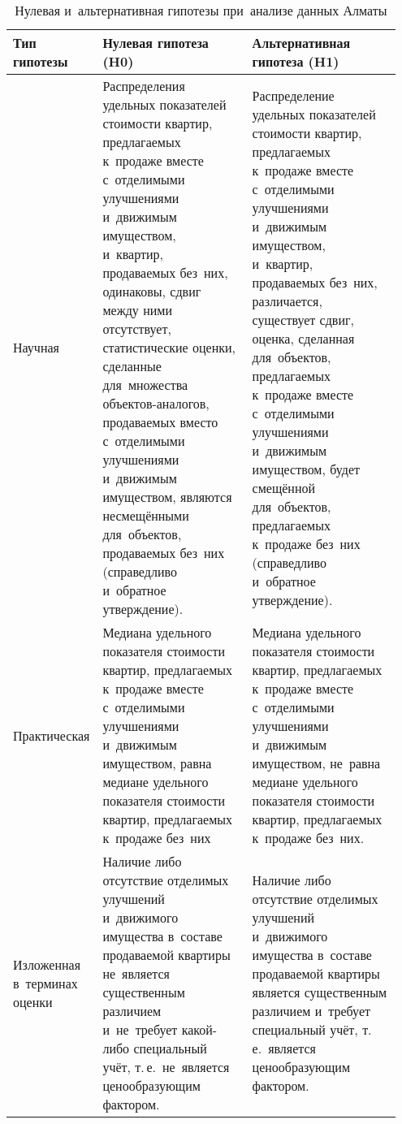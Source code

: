 \documentclass[]{scrartcl}
\begin{document}
\begin{table}[ht]
	\caption{Нулевая и~альтернативная гипотезы при~анализе данных Алматы}  \label{tab:nul-alt-hypothesis-almaty}
	\centering
	\begin{tabularx}{\textwidth}{p{0.15\linewidth} p{0.4\linewidth} p{0.4\linewidth}} 
		\hline
		Тип гипотезы&Нулевая гипотеза (H0)&Альтернативная гипотеза (H1)\\
		\hline
		Научная&Распределения удельных показателей стоимости квартир, предлагаемых к~продаже вместе с~отделимыми улучшениями и~движимым имуществом, и~квартир, продаваемых без~них, одинаковы, сдвиг между ними отсутствует, статистические оценки, сделанные для~множества объектов-аналогов, продаваемых вместо с~отделимыми улучшениями и~движимым имуществом, являются несмещёнными для~объектов, продаваемых без~них (справедливо и~обратное утверждение).&Распределение удельных показателей стоимости квартир, предлагаемых к~продаже вместе с~отделимыми улучшениями и~движимым имуществом, и~квартир, продаваемых без~них, различается, существует сдвиг, оценка, сделанная для~объектов, предлагаемых к~продаже вместе с~отделимыми улучшениями и~движимым имуществом, будет смещённой для~объектов, предлагаемых к~продаже без~них (справедливо и~обратное утверждение).\\
		\hline
		Практическая&Медиана удельного показателя стоимости квартир, предлагаемых к~продаже вместе с~отделимыми улучшениями и~движимым имуществом, равна медиане удельного показателя стоимости квартир, предлагаемых к~продаже без~них&Медиана удельного показателя стоимости квартир, предлагаемых к~продаже вместе с~отделимыми улучшениями и~движимым имуществом, не~равна медиане удельного показателя стоимости квартир, предлагаемых к~продаже без~них.\\
		\hline
		Изложенная в~терминах оценки&Наличие либо отсутствие отделимых улучшений и~движимого имущества в~составе продаваемой квартиры не~является существенным различием и~не~требует какой-либо специальный учёт, т.\,е.~не~является ценообразующим фактором.&Наличие либо отсутствие отделимых улучшений и~движимого имущества в~составе продаваемой квартиры является существенным различием и~требует специальный учёт, т.\,е.~является ценообразующим фактором.\\
		\hline
	\end{tabularx}
\end{table}
\end{document}
